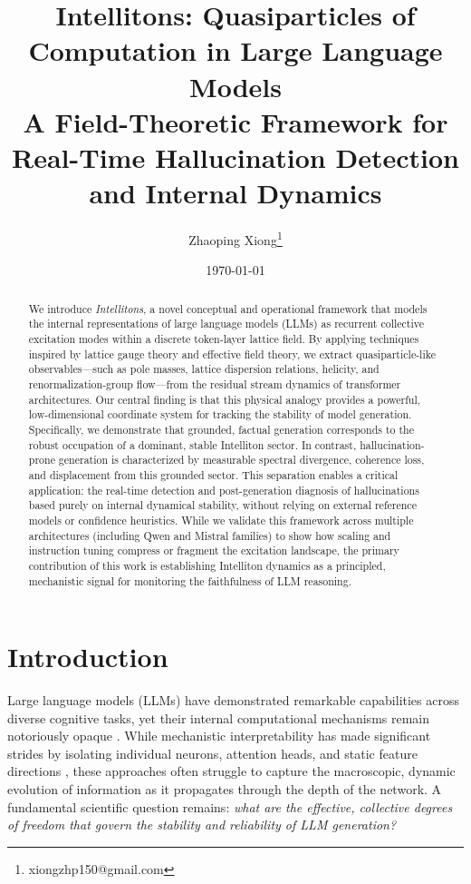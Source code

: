 \documentclass[11pt]{article}
\title{Intellitons: Quasiparticles of Computation in Large Language Models\\
\large A Field-Theoretic Framework for Real-Time Hallucination Detection and Internal Dynamics}
\author[1]{Zhaoping Xiong\thanks{xiongzhp150@gmail.com}}
\affil[1]{ProtonUnfold Tech. Co. Ltd}
\date{\today}
\begin{document}
\maketitle

\begin{abstract}
We introduce \emph{Intellitons}, a novel conceptual and operational framework that models the internal representations of large language models (LLMs) as recurrent collective excitation modes within a discrete token-layer lattice field. By applying techniques inspired by lattice gauge theory and effective field theory, we extract quasiparticle-like observables---such as pole masses, lattice dispersion relations, helicity, and renormalization-group flow---from the residual stream dynamics of transformer architectures. Our central finding is that this physical analogy provides a powerful, low-dimensional coordinate system for tracking the stability of model generation. Specifically, we demonstrate that grounded, factual generation corresponds to the robust occupation of a dominant, stable Intelliton sector. In contrast, hallucination-prone generation is characterized by measurable spectral divergence, coherence loss, and displacement from this grounded sector. This separation enables a critical application: the real-time detection and post-generation diagnosis of hallucinations based purely on internal dynamical stability, without relying on external reference models or confidence heuristics. While we validate this framework across multiple architectures (including Qwen and Mistral families) to show how scaling and instruction tuning compress or fragment the excitation landscape, the primary contribution of this work is establishing Intelliton dynamics as a principled, mechanistic signal for monitoring the faithfulness of LLM reasoning.
\end{abstract}

\section{Introduction}
Large language models (LLMs) have demonstrated remarkable capabilities across diverse cognitive tasks, yet their internal computational mechanisms remain notoriously opaque \citep{bommasani2021opportunities,bubeck2023sparks}. While mechanistic interpretability has made significant strides by isolating individual neurons, attention heads, and static feature directions \citep{olah2020zoom,elhage2021mathematical,geva2020transformer}, these approaches often struggle to capture the macroscopic, dynamic evolution of information as it propagates through the depth of the network. A fundamental scientific question remains: \emph{what are the effective, collective degrees of freedom that govern the stability and reliability of LLM generation?}
\end{document}

